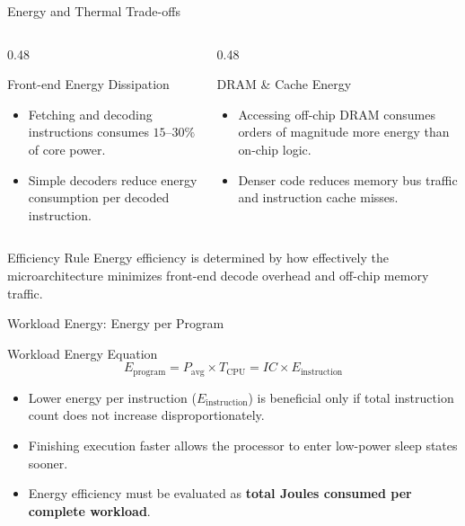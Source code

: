 \documentclass[aspectratio=169,11pt,t]{beamer}
\newcommand{\key}[1]{\textbf{#1}}
\begin{document}
\begin{frame}{Energy and Thermal Trade-offs}
\begin{columns}[T,onlytextwidth]
\begin{column}{0.48\textwidth}
\begin{block}{Front-end Energy Dissipation}
\begin{itemize}\setlength{\itemsep}{5pt}
  \item Fetching and decoding instructions consumes $15\text{--}30\%$ of core power.
  \item Simple decoders reduce energy consumption per decoded instruction.
\end{itemize}
\end{block}
\end{column}

\begin{column}{0.48\textwidth}
\begin{block}{DRAM \& Cache Energy}
\begin{itemize}\setlength{\itemsep}{5pt}
  \item Accessing off-chip DRAM consumes orders of magnitude more energy than on-chip logic.
  \item Denser code reduces memory bus traffic and instruction cache misses.
\end{itemize}
\end{block}
\end{column}
\end{columns}

\vspace{0.3cm}
\normalsize
\begin{block}{Efficiency Rule}
Energy efficiency is determined by how effectively the microarchitecture minimizes front-end decode overhead and off-chip memory traffic.
\end{block}
\end{frame}


\begin{frame}{Workload Energy: Energy per Program}
\begin{block}{Workload Energy Equation}
$$E_{\text{program}} = P_{\text{avg}} \times T_{\text{CPU}} = \mathit{IC} \times E_{\text{instruction}}$$
\end{block}

\vspace{0.2cm}
\large
\begin{itemize}\setlength{\itemsep}{7pt}
  \item Lower energy per instruction ($E_{\text{instruction}}$) is beneficial only if total instruction count does not increase disproportionately.
  \item Finishing execution faster allows the processor to enter low-power sleep states sooner.
  \item Energy efficiency must be evaluated as \key{total Joules consumed per complete workload}.
\end{itemize}
\end{frame}
\end{document}
